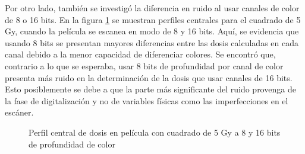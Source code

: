 Por otro lado, también se investigó la diferencia en ruido al usar canales de color de 8 o 16 bits. En la figura  \ref{fig:8o16} se muestran perfiles centrales para el cuadrado de 5 Gy, cuando la película se escanea en modo de 8 y 16 bits. Aquí, se evidencia que usando 8 bits se presentan mayores diferencias entre las dosis calculadas en cada canal debido a la menor capacidad de diferenciar colores. Se encontró que, contrario a lo que se esperaba, usar 8 bits de profundidad por canal de color presenta más ruido en la determinación de la dosis que usar canales de 16 bits. Esto posiblemente se debe a que la parte más significante del ruido provenga de la fase de digitalización y no de variables físicas como las imperfecciones en el escáner. \\
\begin{figure}[H]
	\centering
	\hfill
	\caption{Perfil central de dosis en película con cuadrado de 5 Gy a 8 y 16 bits de profundidad de color}
	\label{fig:8o16}
\end{figure}


